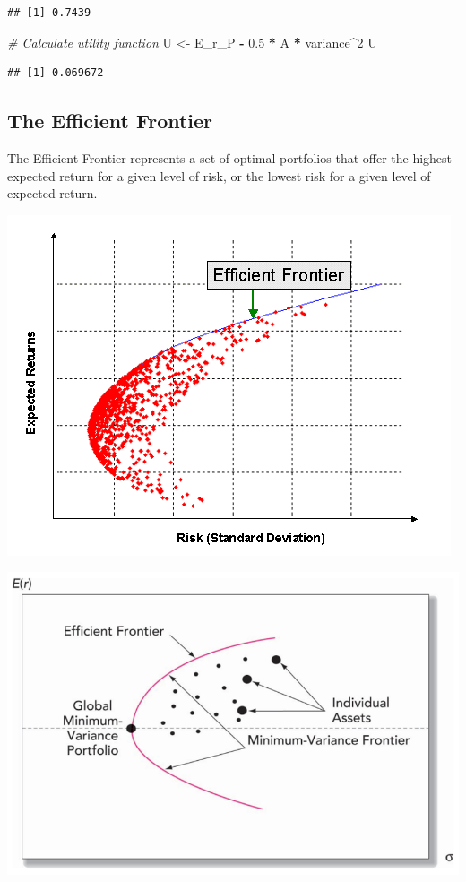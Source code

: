 \documentclass[
]{book}
\newenvironment{Shaded}{\begin{snugshade}}{\end{snugshade}}
\newcommand{\CommentTok}[1]{\textcolor[rgb]{0.56,0.35,0.01}{\textit{#1}}}
\newcommand{\DecValTok}[1]{\textcolor[rgb]{0.00,0.00,0.81}{#1}}
\newcommand{\FloatTok}[1]{\textcolor[rgb]{0.00,0.00,0.81}{#1}}
\newcommand{\NormalTok}[1]{#1}
\newcommand{\OtherTok}[1]{\textcolor[rgb]{0.56,0.35,0.01}{#1}}
\newcommand{\SpecialCharTok}[1]{\textcolor[rgb]{0.81,0.36,0.00}{\textbf{#1}}}
\begin{document}
\begin{verbatim}
## [1] 0.7439
\end{verbatim}

\begin{Shaded}
\begin{Highlighting}[]
\CommentTok{\# Calculate utility function}
\NormalTok{U }\OtherTok{\textless{}{-}}\NormalTok{ E\_r\_P }\SpecialCharTok{{-}} \FloatTok{0.5} \SpecialCharTok{*}\NormalTok{ A }\SpecialCharTok{*}\NormalTok{ variance}\SpecialCharTok{\^{}}\DecValTok{2}
\NormalTok{U}
\end{Highlighting}
\end{Shaded}

\begin{verbatim}
## [1] 0.069672
\end{verbatim}

\hypertarget{the-efficient-frontier}{%
\subsection{The Efficient Frontier}\label{the-efficient-frontier}}

The Efficient Frontier represents a set of optimal portfolios that offer the highest expected return for a given level of risk, or the lowest risk for a given level of expected return.

\includegraphics{Resources/efffrontier2.png}

\includegraphics{Resources/efffrontier.png}
\end{document}
